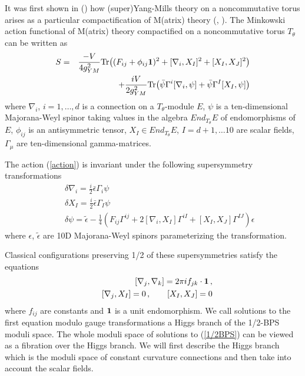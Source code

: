 \documentclass[a4paper,a4paper]{article}
\begin{document}
It was first shown in (\cite{CDS}) how (super)Yang-Mills theory 
on a noncommutative torus arises as a particular compactification of 
M(atrix) theory (\cite{BFSS}, \cite{IKKT}). 
The Minkowski action functional of M(atrix) theory compactified on a noncommutative
torus $T_{\theta}$ can be written as
\begin{eqnarray} \label{action}
S =&& \frac{-V}{4g_{YM}^{2}} {\rm Tr} \bigl( (F_{ij} + \phi_{ij}{\bf 1})^{2}
 + [\nabla_{i}, X_{I}]^{2} + [X_{I}, X_{J}]^{2} \bigr) \nonumber \\
&& + \frac{iV}{2g_{YM}^{2}} {\rm Tr} \bigl( \bar \psi \Gamma^{i} [\nabla_{i} ,
\psi ] + \bar \psi \Gamma^{I} [X_{I} ,\psi ] \bigr)
\end{eqnarray}
where  $\nabla_{i}$, $i=1,\dots, d$ is a connection on a $T_{\theta}$-module $E$, 
$\psi$ is a ten-dimensional Majorana-Weyl spinor taking values in the algebra $End_{T_{\theta}}E$ 
of endomorphisms of $E$, $\phi_{ij}$ is an antisymmetric tensor,  $X_{I}\in End_{T_{\theta}}E$, $I=d+1, \dots 10$  
are scalar fields, 
$\Gamma_{\mu}$ are ten-dimensional gamma-matrices. 

The  action (\ref{action}) is invariant
under the following supersymmetry
transformations
\begin{eqnarray} \label{susy}
&&\delta \nabla_{i} = \frac{i}{2}\bar \epsilon \Gamma_{i}\psi
\nonumber \\
&&\delta X_{I} = \frac{i}{2}\bar \epsilon \Gamma_{I}\psi
\nonumber \\
&& \delta \psi = \tilde \epsilon -\frac{1}{4} (F_{ij}\Gamma^{ij} + 2[\nabla_{i}, X_{I}]\Gamma^{iI} + [X_{I}, X_{J}]\Gamma^{IJ})
\epsilon 
\end{eqnarray}
where $\epsilon$, $\tilde \epsilon$ are 10D Majorana-Weyl spinors parameterizing the transformation.


Classical configurations preserving 1/2 of these supersymmetries satisfy the equations
\begin{eqnarray}\label{1/2BPS}
&& [\nabla_{j}, \nabla_{k}]=2\pi i f_{jk}\cdot {\bf 1} \, , \nonumber \\
&& [\nabla_{j}, X_{I}] = 0 \, , \qquad [X_{I}, X_{J}]=0 
\end{eqnarray}
where $f_{ij}$ are constants and $\bf 1$ is a unit endomorphism. 
We call solutions to the first equation modulo gauge transformations  a Higgs branch of the 1/2-BPS moduli space. 
The whole moduli space of solutions to (\ref{1/2BPS}) can be viewed as a fibration over the Higgs branch. 
We will first describe the Higgs branch which is the moduli space of constant curvature connections and then 
take into account the scalar fields. 
\end{document}
